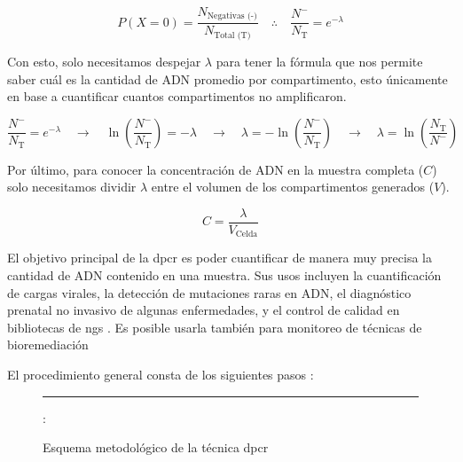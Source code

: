 \documentclass{AsignaturaResumen}
\begin{document}
\begin{equation*}
    P(X=0) = \frac{N_{\text{Negativas (-)}}}{N_{\text{Total (T)}}} \quad\therefore\quad \frac{N^{-}}{N_{\text{T}}} = e^{-\lambda}
\end{equation*}

Con esto, solo necesitamos despejar $\lambda$ para tener la fórmula que nos permite saber cuál es la cantidad de ADN promedio por compartimento, esto únicamente en base a cuantificar cuantos compartimentos no amplificaron.

\begin{equation*}
    \frac{N^{-}}{N_{\text{T}}} = e^{-\lambda}
    \quad\longrightarrow\quad
    \ln\left(\frac{N^{-}}{N_{\text{T}}}\right) = -\lambda
    \quad\longrightarrow\quad
    \lambda = -\ln\left(\frac{N^{-}}{N_{\text{T}}}\right)
    \quad\longrightarrow\quad
    \lambda = \ln\left(\frac{N_{\text{T}}}{N^{-}}\right)
\end{equation*}

Por último, para conocer la concentración de ADN en la muestra completa ($C$) solo necesitamos dividir $\lambda$ entre el volumen de los compartimentos generados ($V$).

\begin{equation}\label{eq:cuantificacion_por_dpcr}
    C = \frac{\lambda}{V_{\text{Celda}}}
\end{equation}

El objetivo principal de la \acrshort{dpcr} es poder cuantificar de manera muy precisa la cantidad de ADN contenido en una muestra. Sus usos incluyen la cuantificación de cargas virales, la detección de mutaciones raras en ADN, el diagnóstico prenatal no invasivo de algunas enfermedades, y el control de calidad en bibliotecas de \acrfull{ngs} \citep{maoPrinciplesDigitalPCR2019}. Es posible usarla también para monitoreo de técnicas de bioremediación \citep{caoDigitalPCREmerging2020}

El procedimiento general consta de los siguientes pasos \citep{maoPrinciplesDigitalPCR2019}:

\begin{figure}
    \centering
    \resizebox{\linewidth}{!}{}
    \rule{\linewidth}{0.5pt}
    \caption{Esquema metodológico de la técnica \acrshort{dpcr}}
    \label{fig}:
\end{figure}
\end{document}
